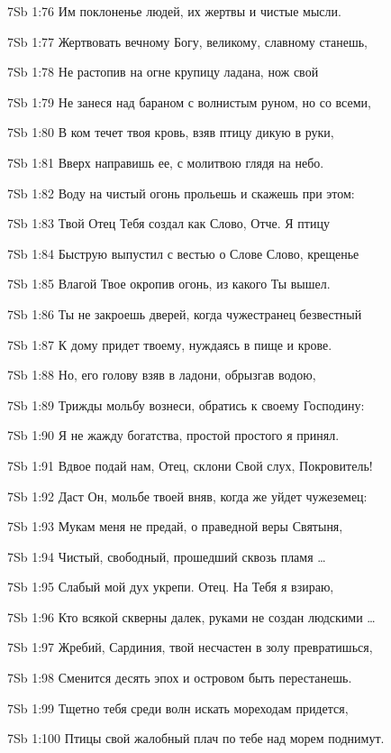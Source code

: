 \vs 7Sb 1:76 Им поклоненье людей, их жертвы и чистые мысли.

\vs 7Sb 1:77 Жертвовать вечному Богу, великому, славному станешь, 

\vs 7Sb 1:78 Не растопив на огне крупицу ладана, нож свой 

\vs 7Sb 1:79 Не занеся над бараном с волнистым руном, но со всеми, 

\vs 7Sb 1:80 В ком течет твоя кровь, взяв птицу дикую в руки, 

\vs 7Sb 1:81 Вверх направишь ее, с молитвою глядя на небо.

\vs 7Sb 1:82 Воду на чистый огонь прольешь и скажешь при этом: 

\vs 7Sb 1:83 Твой Отец Тебя создал как Слово, Отче. Я птицу 

\vs 7Sb 1:84 Быструю выпустил с вестью  о Слове Слово, крещенье 

\vs 7Sb 1:85 Влагой Твое окропив  огонь, из какого Ты вышел.

\vs 7Sb 1:86 Ты не закроешь дверей, когда чужестранец безвестный 

\vs 7Sb 1:87 К дому придет твоему, нуждаясь в пище и крове. 

\vs 7Sb 1:88 Но, его голову взяв в ладони, обрызгав водою, 

\vs 7Sb 1:89 Трижды мольбу вознеси, обратись к своему Господину: 

\vs 7Sb 1:90 Я не жажду богатства, простой  простого я принял.

\vs 7Sb 1:91 Вдвое подай нам, Отец, склони Свой слух, Покровитель! 

\vs 7Sb 1:92 Даст Он, мольбе твоей вняв, когда же уйдет чужеземец: 

\vs 7Sb 1:93 Мукам меня не предай, о праведной веры Святыня, 

\vs 7Sb 1:94 Чистый, свободный, прошедший сквозь пламя \ldots

\vs 7Sb 1:95 Слабый мой дух укрепи. Отец. На Тебя я взираю, 

\vs 7Sb 1:96 Кто всякой скверны далек, руками не создан людскими \ldots

\vs 7Sb 1:97 Жребий, Сардиния, твой несчастен  в золу превратишься, 

\vs 7Sb 1:98 Сменится десять эпох  и островом быть перестанешь. 

\vs 7Sb 1:99 Тщетно тебя среди волн искать мореходам придется, 

\vs 7Sb 1:100 Птицы свой жалобный плач по тебе над морем поднимут.

